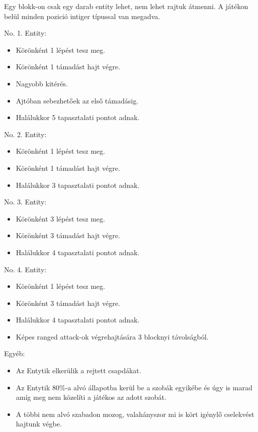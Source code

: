 
Egy blokk-on csak egy darab entity lehet, nem lehet rajtuk átmenni.
A játékon belül minden pozició intiger típussal van megadva.



\noindent No. 1. Entity:
\begin{itemize}
    \item Körönként 1 lépést tesz meg.
    \item Körönként 1 támadást hajt végre.
    \item Nagyobb kitérés.
    \item Ajtóban sebezhetőek az első támadásig.
    \item Halálukkor 5 tapasztalati pontot adnak.
\end{itemize}

\noindent No. 2. Entity:
\begin{itemize}
    \item Körönként 1 lépést tesz meg.
    \item Körönként 1 támadást hajt végre.
    \item Halálukkor 3 tapasztalati pontot adnak.
\end{itemize}

\noindent No. 3. Entity:
\begin{itemize}
    \item Körönként 3 lépést tesz meg.
    \item Körönként 3 támadást hajt végre.
    \item Halálukkor 4 tapasztalati pontot adnak.
\end{itemize}

\noindent No. 4. Entity:
\begin{itemize}
    \item Körönként 1 lépést tesz meg.
    \item Körönként 3 támadást hajt végre.
    \item Halálukkor 4 tapasztalati pontot adnak.
    \item Képes ranged attack-ok végrehajtására 3 blocknyi távolságból.
\end{itemize}

\noindent Egyéb:
\begin{itemize}
    \item Az Entytik elkerülik a rejtett csapdákat.
    \item Az Entytik 80\%-a alvó állapotba kerül be a szobák egyikébe és úgy is marad amíg meg nem közelíti a játékos az adott szobát.
    \item A többi nem alvó szabadon mozog, valahányszor mi is kört igénylő cselekvést hajtunk végbe.
\end{itemize}

